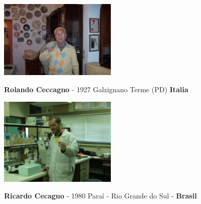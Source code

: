 \documentclass[a4paper,10pt]{book}
\begin{document}
% 

\begin{figure}[htp]
\centering
\includegraphics[width=0.5\textwidth]{../img/03-rolando.png}\label{fig:03-rolando.png}
\caption{\textbf{Rolando Ceccagno} - 1927 Galzignano Terme (PD) \textbf{Italia}}
\end{figure}

\begin{figure}[htp]
\centering
\includegraphics[width=0.5\textwidth]{../img/04-ricardo.png}\label{fig:04-ricardo.png}
\caption{\textbf{Ricardo Cecagno} - 1980 Paraí - Rio Grande do Sul - \textbf{Brasil}}
\end{figure}
\end{document}
